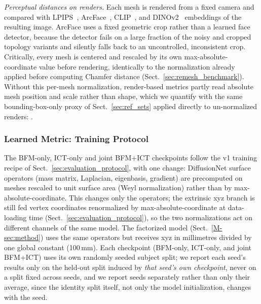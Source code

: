 \emph{Perceptual distances on renders.} Each mesh is rendered from a fixed camera and compared with LPIPS~\cite{lpips}, ArcFace~\cite{deng2019arcface}, CLIP~\cite{radford2021clip}, and DINOv2~\cite{oquab2023dinov2} embeddings of the resulting image. ArcFace uses a fixed geometric crop rather than a learned face detector, because the detector fails on a large fraction of the noisy and cropped topology variants and silently falls back to an uncontrolled, inconsistent crop. Critically, every mesh is centered and rescaled by its own max-absolute-coordinate value before rendering, identically to the normalization already applied before computing Chamfer distance (Sect.~\ref{sec:remesh_benchmark}). Without this per-mesh normalization, render-based metrics partly read absolute mesh position and scale rather than shape, which we quantify with the same bounding-box-only proxy of Sect.~\ref{sec:ref_sets} applied directly to un-normalized renders: .

\subsubsection{Learned Metric: Training Protocol}
\label{sec:learned_metric_protocol}
The BFM-only, ICT-only and joint BFM+ICT checkpoints follow the v1 training recipe of Sect.~\ref{sec:evaluation_protocol}, with one change: DiffusionNet surface operators (mass matrix, Laplacian, eigenbasis, gradient) are precomputed on meshes rescaled to unit surface area (Weyl normalization) rather than by max-absolute-coordinate. This changes only the operators; the extrinsic xyz branch is still fed vertex coordinates renormalized by max-absolute-coordinate at data-loading time (Sect.~\ref{sec:evaluation_protocol}), so the two normalizations act on different channels of the same model. The factorized model (Sect.~\ref{M-sec:method}) uses the same operators but receives xyz in millimetres divided by one global constant (100\,mm). Each checkpoint (BFM-only, ICT-only, and joint BFM+ICT) uses its own randomly seeded subject split; we report each seed's results only on the held-out split induced by \emph{that seed's own checkpoint}, never on a split fixed across seeds, and we report seeds separately rather than only their average, since the identity split itself, not only the model initialization, changes with the seed.

